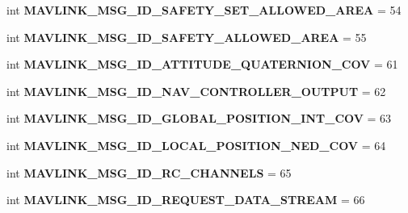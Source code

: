 \begin{DoxyCompactItemize}
int {\bfseries M\+A\+V\+L\+I\+N\+K\+\_\+\+M\+S\+G\+\_\+\+I\+D\+\_\+\+S\+A\+F\+E\+T\+Y\+\_\+\+S\+E\+T\+\_\+\+A\+L\+L\+O\+W\+E\+D\+\_\+\+A\+R\+EA} = 54
\item 
\mbox{\label{namespacepymavlink_1_1dialects_1_1v10_af695b930ccbb68d4ef2674763da1b085}} 
int {\bfseries M\+A\+V\+L\+I\+N\+K\+\_\+\+M\+S\+G\+\_\+\+I\+D\+\_\+\+S\+A\+F\+E\+T\+Y\+\_\+\+A\+L\+L\+O\+W\+E\+D\+\_\+\+A\+R\+EA} = 55
\item 
\mbox{\label{namespacepymavlink_1_1dialects_1_1v10_a77b5b48d0dc391be71edb25ebf58015f}} 
int {\bfseries M\+A\+V\+L\+I\+N\+K\+\_\+\+M\+S\+G\+\_\+\+I\+D\+\_\+\+A\+T\+T\+I\+T\+U\+D\+E\+\_\+\+Q\+U\+A\+T\+E\+R\+N\+I\+O\+N\+\_\+\+C\+OV} = 61
\item 
\mbox{\label{namespacepymavlink_1_1dialects_1_1v10_a155d2671e3918a7f402ecdba3547b07c}} 
int {\bfseries M\+A\+V\+L\+I\+N\+K\+\_\+\+M\+S\+G\+\_\+\+I\+D\+\_\+\+N\+A\+V\+\_\+\+C\+O\+N\+T\+R\+O\+L\+L\+E\+R\+\_\+\+O\+U\+T\+P\+UT} = 62
\item 
\mbox{\label{namespacepymavlink_1_1dialects_1_1v10_af8120151786f86294d68749be2655b34}} 
int {\bfseries M\+A\+V\+L\+I\+N\+K\+\_\+\+M\+S\+G\+\_\+\+I\+D\+\_\+\+G\+L\+O\+B\+A\+L\+\_\+\+P\+O\+S\+I\+T\+I\+O\+N\+\_\+\+I\+N\+T\+\_\+\+C\+OV} = 63
\item 
\mbox{\label{namespacepymavlink_1_1dialects_1_1v10_a309a3857eba74424581b45faec3bc3c2}} 
int {\bfseries M\+A\+V\+L\+I\+N\+K\+\_\+\+M\+S\+G\+\_\+\+I\+D\+\_\+\+L\+O\+C\+A\+L\+\_\+\+P\+O\+S\+I\+T\+I\+O\+N\+\_\+\+N\+E\+D\+\_\+\+C\+OV} = 64
\item 
\mbox{\label{namespacepymavlink_1_1dialects_1_1v10_a3c1199a41b2a97689d8a63154c31afc2}} 
int {\bfseries M\+A\+V\+L\+I\+N\+K\+\_\+\+M\+S\+G\+\_\+\+I\+D\+\_\+\+R\+C\+\_\+\+C\+H\+A\+N\+N\+E\+LS} = 65
\item 
\mbox{\label{namespacepymavlink_1_1dialects_1_1v10_ac12f2833f864a241ee43a2a93b0615fa}} 
int {\bfseries M\+A\+V\+L\+I\+N\+K\+\_\+\+M\+S\+G\+\_\+\+I\+D\+\_\+\+R\+E\+Q\+U\+E\+S\+T\+\_\+\+D\+A\+T\+A\+\_\+\+S\+T\+R\+E\+AM} = 66

\end{DoxyCompactItemize}
